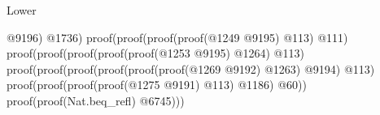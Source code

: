 \begin{lexlean}{Lower}
\begin{coremodule}
                                                                                                @9196)
                                                                                              @1736)
                                                                                            proof(proof(proof(proof(@1249
                                                                                                      @9195)
                                                                                                    @113)
                                                                                                  @111)
                                                                                                proof(proof(proof(proof(proof(@1253
                                                                                                            @9195)
                                                                                                          @1264)
                                                                                                        @113)
                                                                                                      proof(proof(proof(proof(proof(proof(@1269
                                                                                                                    @9192)
                                                                                                                  @1263)
                                                                                                                @9194)
                                                                                                              @113)
                                                                                                            proof(proof(proof(proof(@1275
                                                                                                                      @9191)
                                                                                                                    @113)
                                                                                                                  @1186)
                                                                                                                @60))
                                                                                                          proof(proof(Nat.beq_refl)
                                                                                                              @6745)))

\end{coremodule}
\end{lexlean}
